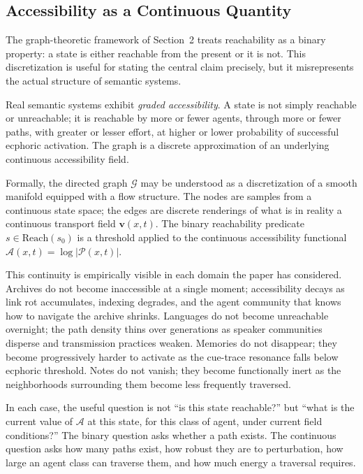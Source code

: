\documentclass[12pt]{article}
\newcommand{\sG}{\mathcal{G}}
\newcommand{\reach}{\mathrm{Reach}}
\begin{document}
\subsection{Accessibility as a Continuous Quantity}

The graph-theoretic framework of Section~2 treats reachability as a
binary property: a state is either reachable from the present or it is
not.
This discretization is useful for stating the central claim precisely,
but it misrepresents the actual structure of semantic systems.

Real semantic systems exhibit \emph{graded accessibility}.
A state is not simply reachable or unreachable; it is reachable by more
or fewer agents, through more or fewer paths, with greater or lesser
effort, at higher or lower probability of successful ecphoric activation.
The graph is a discrete approximation of an underlying continuous
accessibility field.

Formally, the directed graph $\sG$ may be understood as a discretization
of a smooth manifold equipped with a flow structure.
The nodes are samples from a continuous state space; the edges are
discrete renderings of what is in reality a continuous transport field
$\mathbf{v}(x,t)$.
The binary reachability predicate $s \in \reach(s_0)$ is a threshold
applied to the continuous accessibility functional
$\mathcal{A}(x,t) = \log|\mathcal{P}(x,t)|$.

This continuity is empirically visible in each domain the paper has
considered.
Archives do not become inaccessible at a single moment; accessibility
decays as link rot accumulates, indexing degrades, and the agent
community that knows how to navigate the archive shrinks.
Languages do not become unreachable overnight; the path density
thins over generations as speaker communities disperse and
transmission practices weaken.
Memories do not disappear; they become progressively harder to
activate as the cue-trace resonance falls below ecphoric threshold.
Notes do not vanish; they become functionally inert as the
neighborhoods surrounding them become less frequently traversed.

In each case, the useful question is not ``is this state reachable?''
but ``what is the current value of $\mathcal{A}$ at this state, for
this class of agent, under current field conditions?''
The binary question asks whether a path exists.
The continuous question asks how many paths exist, how robust they are
to perturbation, how large an agent class can traverse them, and how
much energy a traversal requires.
\end{document}
